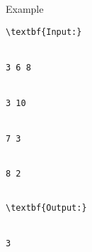 Example
\begin{verbatim}
\textbf{Input:}


3 6 8


3 10


7 3


8 2


\end{verbatim}
\begin{itemize}
\end{itemize}
\begin{verbatim}
\textbf{Output:}


3


\end{verbatim}